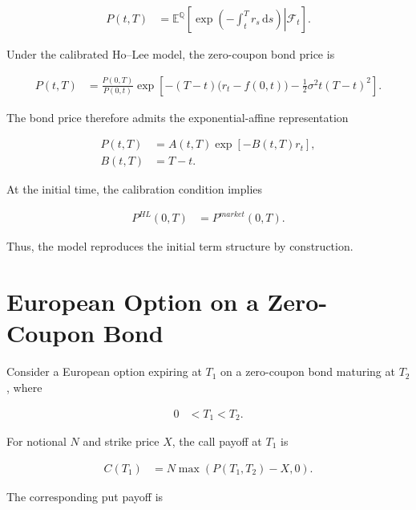 \documentclass[11pt,a4paper]{article}
\newcommand{\E}{\mathbb{E}}
\newcommand{\Q}{\mathbb{Q}}
\newcommand{\dd}{\,\mathrm{d}}
\numberwithin{equation}{section}
\begin{document}
\begin{align*}
    P(t,T)
    &=
    \E^{\Q}
    \left[
        \left.
        \exp
        \left(
            -\int_t^T r_s\dd s
        \right)
        \right|
        \mathcal{F}_t
    \right].
\end{align*}

Under the calibrated Ho--Lee model, the zero-coupon bond price is

\begin{align*}
    P(t,T)
    &=
    \frac{P(0,T)}{P(0,t)}
    \exp
    \left[
        -(T-t)
        \bigl(r_t-f(0,t)\bigr)
        -
        \frac{1}{2}
        \sigma^2t(T-t)^2
    \right].
\end{align*}

The bond price therefore admits the exponential-affine representation

\begin{align*}
    P(t,T)
    &=
    A(t,T)\exp[-B(t,T)r_t],
    \\
    B(t,T)
    &=
    T-t.
\end{align*}

At the initial time, the calibration condition implies

\begin{align*}
    P^{HL}(0,T)
    &=
    P^{market}(0,T).
\end{align*}

Thus, the model reproduces the initial term structure by construction.


\section{European Option on a Zero-Coupon Bond}

Consider a European option expiring at $T_1$ on a zero-coupon bond
maturing at $T_2$, where

\begin{align*}
    0
    &<
    T_1
    <
    T_2.
\end{align*}

For notional $N$ and strike price $X$, the call payoff at $T_1$ is

\begin{align*}
    C(T_1)
    &=
    N\max\left(P(T_1,T_2)-X,0\right).
\end{align*}

The corresponding put payoff is
\end{document}
